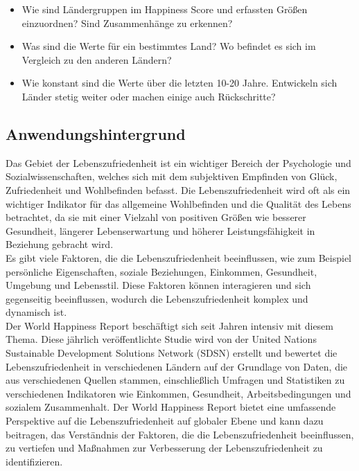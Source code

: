 \begin{itemize}
    \item Wie sind Ländergruppen im Happiness Score und erfassten Größen einzuordnen? Sind Zusammenhänge zu erkennen? 
    \item Was sind die Werte für ein bestimmtes Land? Wo befindet es sich im Vergleich zu den anderen Ländern? 
    \item Wie konstant sind die Werte über die letzten 10-20 Jahre. Entwickeln sich Länder stetig weiter oder machen einige auch Rückschritte?
\end{itemize}

\subsection{Anwendungshintergrund}
Das Gebiet der Lebenszufriedenheit ist ein wichtiger Bereich der Psychologie und Sozialwissenschaften, welches sich mit dem subjektiven Empfinden von Glück, Zufriedenheit und Wohlbefinden befasst. \cite{frawley2015happiness} Die Lebenszufriedenheit wird oft als ein wichtiger Indikator für das allgemeine Wohlbefinden und die Qualität des Lebens betrachtet, da sie mit einer Vielzahl von positiven Größen wie besserer Gesundheit, längerer Lebenserwartung und höherer Leistungsfähigkeit in Beziehung gebracht wird. \cite{steptoe2019happiness}
\\

Es gibt viele Faktoren, die die Lebenszufriedenheit beeinflussen, wie zum Beispiel persönliche Eigenschaften, soziale Beziehungen, Einkommen, Gesundheit, Umgebung und Lebensstil. Diese Faktoren können interagieren und sich gegenseitig beeinflussen, wodurch die Lebenszufriedenheit komplex und dynamisch ist. \cite{fernandez2001contribution}
\\

Der World Happiness Report beschäftigt sich seit Jahren intensiv mit diesem Thema. Diese jährlich veröffentlichte Studie wird von der United Nations Sustainable Development Solutions Network (SDSN) erstellt und bewertet die Lebenszufriedenheit in verschiedenen Ländern auf der Grundlage von Daten, die aus verschiedenen Quellen stammen, einschließlich Umfragen und Statistiken zu verschiedenen Indikatoren wie Einkommen, Gesundheit, Arbeitsbedingungen und sozialem Zusammenhalt. \cite{helliwell_world_2021} Der World Happiness Report bietet eine umfassende Perspektive auf die Lebenszufriedenheit auf globaler Ebene und kann dazu beitragen, das Verständnis der Faktoren, die die Lebenszufriedenheit beeinflussen, zu vertiefen und Maßnahmen zur Verbesserung der Lebenszufriedenheit zu identifizieren. 


